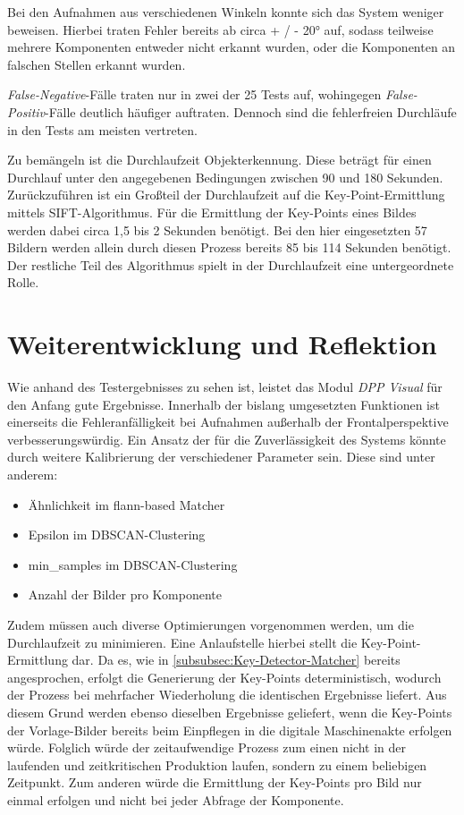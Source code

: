 \documentclass[
    type=Projektarbeit,
    status=draft, %
    language=german, %
    bibengine=bibtex,
]{unibwm-inf-thesis}
\begin{document}
    Bei den Aufnahmen aus verschiedenen Winkeln konnte sich das System weniger beweisen.
    Hierbei traten Fehler bereits ab circa + / - 20° auf, sodass teilweise mehrere Komponenten entweder nicht erkannt wurden, oder die Komponenten an falschen Stellen erkannt wurden.

    \textit{False-Negative}-Fälle traten nur in zwei der 25 Tests auf, wohingegen \textit{False-Positiv}-Fälle deutlich häufiger auftraten.
    Dennoch sind die fehlerfreien Durchläufe in den Tests am meisten vertreten.

    Zu bemängeln ist die Durchlaufzeit Objekterkennung.
    Diese beträgt für einen Durchlauf unter den angegebenen Bedingungen zwischen 90 und 180 Sekunden.
    Zurückzuführen ist ein Großteil der Durchlaufzeit auf die Key-Point-Ermittlung mittels SIFT-Algorithmus.
    Für die Ermittlung der Key-Points eines Bildes werden dabei circa 1,5 bis 2 Sekunden benötigt.
    Bei den hier eingesetzten 57 Bildern werden allein durch diesen Prozess bereits 85 bis 114 Sekunden benötigt.
    Der restliche Teil des Algorithmus spielt in der Durchlaufzeit eine untergeordnete Rolle.


    \section{Weiterentwicklung und Reflektion}
    Wie anhand des Testergebnisses zu sehen ist, leistet das Modul \textit{DPP Visual} für den Anfang gute Ergebnisse.
    Innerhalb der bislang umgesetzten Funktionen ist einerseits die Fehleranfälligkeit bei Aufnahmen außerhalb der Frontalperspektive verbesserungswürdig.
    Ein Ansatz der für die Zuverlässigkeit des Systems könnte durch weitere Kalibrierung der verschiedener Parameter sein.
    Diese sind unter anderem:
    \begin{itemize}
        \item Ähnlichkeit im flann-based Matcher
        \item Epsilon im DBSCAN-Clustering
        \item min\_samples im DBSCAN-Clustering
        \item Anzahl der Bilder pro Komponente
    \end{itemize}

    Zudem müssen auch diverse Optimierungen vorgenommen werden, um die Durchlaufzeit zu minimieren.
    Eine Anlaufstelle hierbei stellt die Key-Point-Ermittlung dar.
    Da es, wie in \autoref{subsubsec:Key-Detector-Matcher} bereits angesprochen, erfolgt die Generierung der Key-Points deterministisch, wodurch der Prozess bei mehrfacher Wiederholung die identischen Ergebnisse liefert.
    Aus diesem Grund werden ebenso dieselben Ergebnisse geliefert, wenn die Key-Points der Vorlage-Bilder bereits beim Einpflegen in die digitale Maschinenakte erfolgen würde.
    Folglich würde der zeitaufwendige Prozess zum einen nicht in der laufenden und zeitkritischen Produktion laufen, sondern zu einem beliebigen Zeitpunkt.
    Zum anderen würde die Ermittlung der Key-Points pro Bild nur einmal erfolgen und nicht bei jeder Abfrage der Komponente.
\end{document}
